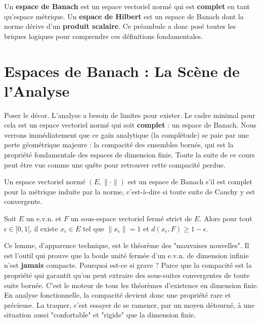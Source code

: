 \begin{remark}
    Un \textbf{espace de Banach} est un espace vectoriel normé qui est \textbf{complet} en tant qu'espace métrique.
    Un \textbf{espace de Hilbert} est un espace de Banach dont la norme dérive d'un \textbf{produit scalaire}.
    Ce préambule a donc posé toutes les briques logiques pour comprendre ces définitions fondamentales.
\end{remark}


\section{Espaces de Banach : La Scène de l'Analyse}

\begin{objectif}
    Poser le décor. L'analyse a besoin de limites pour exister. Le cadre minimal pour cela est un espace vectoriel normé qui soit \textbf{complet} : un espace de Banach. Nous verrons immédiatement que ce gain analytique (la complétude) se paie par une perte géométrique majeure : la compacité des ensembles bornés, qui est la propriété fondamentale des espaces de dimension finie. Toute la suite de ce cours peut être vue comme une quête pour retrouver cette compacité perdue.
\end{objectif}

\begin{definition}
    Un espace vectoriel normé $(E, \|\cdot\|)$ est un espace de Banach s'il est complet pour la métrique induite par la norme, c'est-à-dire si toute suite de Cauchy y est convergente.
\end{definition}

\begin{theorem}
    Soit $E$ un e.v.n. et $F$ un sous-espace vectoriel fermé strict de $E$. Alors pour tout $\epsilon \in ]0,1[$, il existe $x_\epsilon \in E$ tel que $\|x_\epsilon\|=1$ et $d(x_\epsilon, F) \geq 1-\epsilon$.
\end{theorem}

\begin{remark}
    Ce lemme, d'apparence technique, est le théorème des "mauvaises nouvelles". Il est l'outil qui prouve que la boule unité fermée d'un e.v.n. de dimension infinie n'est \textbf{jamais} compacte.
    Pourquoi est-ce si grave ? Parce que la compacité est la propriété qui garantit qu'on peut extraire des sous-suites convergentes de toute suite bornée. C'est le moteur de tous les théorèmes d'existence en dimension finie. En analyse fonctionnelle, la compacité devient donc une propriété rare et précieuse. La traquer, c'est essayer de se ramener, par un moyen détourné, à une situation aussi "confortable" et "rigide" que la dimension finie.
\end{remark}

